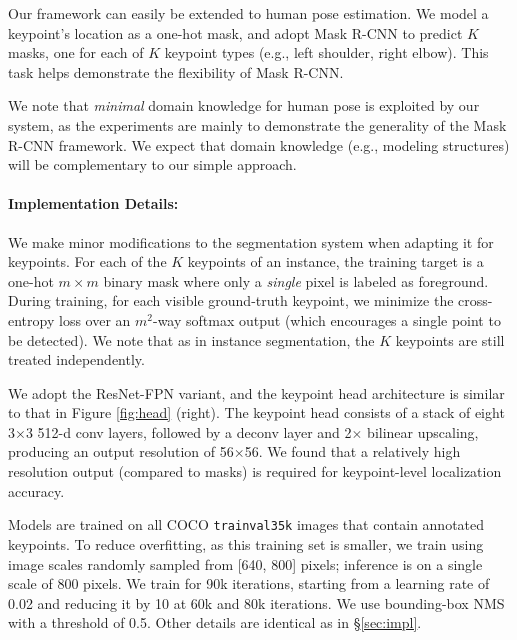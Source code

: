 \label{sec:keypoints}

Our framework can easily be extended to human pose estimation. We model a keypoint's location as a one-hot mask, and adopt Mask R-CNN to predict $K$ masks, one for each of $K$ keypoint types (e.g., left shoulder, right elbow). This task helps demonstrate the flexibility of Mask R-CNN.

We note that \emph{minimal} domain knowledge for human pose is exploited by our system, as the experiments are mainly to demonstrate the generality of the Mask R-CNN framework. We expect that domain knowledge (e.g., modeling structures) will be complementary to our simple approach.

\paragraph{Implementation Details:} We make minor modifications to the segmentation system when adapting it for keypoints. For each of the $K$ keypoints of an instance, the training target is a one-hot $m \times m$ binary mask where only a \emph{single} pixel is labeled as foreground. During training, for each visible ground-truth keypoint, we minimize the cross-entropy loss over an $m^2$-way softmax output (which encourages a single point to be detected). We note that as in instance segmentation, the $K$ keypoints are still treated independently.

We adopt the ResNet-FPN variant, and the keypoint head architecture is similar to that in Figure \ref{fig:head} (right). The keypoint head consists of a stack of eight 3$\times$3 512-d conv layers, followed by a deconv layer and 2$\times$ bilinear upscaling, producing an output resolution of 56$\times$56. We found that a relatively high resolution output (compared to masks) is required for keypoint-level localization accuracy.

Models are trained on all COCO \texttt{trainval35k} images that contain annotated keypoints. To reduce overfitting, as this training set is smaller, we train using image scales randomly sampled from [640, 800] pixels; inference is on a single scale of 800 pixels. We train for 90k iterations, starting from a learning rate of 0.02 and reducing it by 10 at 60k and 80k iterations. We use bounding-box NMS with a threshold of 0.5. Other details are identical as in \S\ref{sec:impl}.

